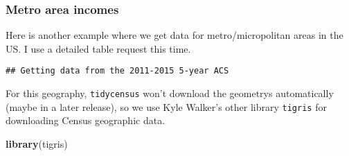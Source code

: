 \documentclass[]{article}
\newenvironment{Shaded}{\begin{snugshade}}{\end{snugshade}}
\newcommand{\KeywordTok}[1]{\textcolor[rgb]{0.13,0.29,0.53}{\textbf{#1}}}
\newcommand{\DataTypeTok}[1]{\textcolor[rgb]{0.13,0.29,0.53}{#1}}
\newcommand{\DecValTok}[1]{\textcolor[rgb]{0.00,0.00,0.81}{#1}}
\newcommand{\StringTok}[1]{\textcolor[rgb]{0.31,0.60,0.02}{#1}}
\newcommand{\CommentTok}[1]{\textcolor[rgb]{0.56,0.35,0.01}{\textit{#1}}}
\newcommand{\OtherTok}[1]{\textcolor[rgb]{0.56,0.35,0.01}{#1}}
\newcommand{\OperatorTok}[1]{\textcolor[rgb]{0.81,0.36,0.00}{\textbf{#1}}}
\newcommand{\NormalTok}[1]{#1}
\begin{document}
\newpage

\subsubsection{Metro area incomes}\label{metro-area-incomes}

Here is another example where we get data for metro/micropolitan areas
in the US. I use a detailed table request this time.

\begin{Shaded}
\end{Shaded}

\begin{verbatim}
## Getting data from the 2011-2015 5-year ACS
\end{verbatim}

For this geography, \texttt{tidycensus} won't download the geometrys
automatically (maybe in a later release), so we use Kyle Walker's other
library \texttt{tigris} for downloading Census geographic data.

\begin{Shaded}
\begin{Highlighting}[]
\KeywordTok{library}\NormalTok{(tigris)}
\end{Highlighting}
\end{Shaded}
\end{document}
